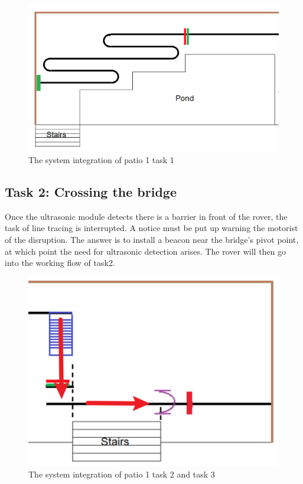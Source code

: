 \documentclass[12pt, a4paper, oneside]{report}
\begin{document}
 \begin{figure}[H]
     \centering
     \includegraphics[scale=0.5]{pic/patio1/5.png} 
     \caption{The system integration of patio 1 task 1 \cite{patio1}}
     \label{sysint2}
 \end{figure}

\subsection{Task 2: Crossing the bridge}
 Once the ultrasonic module detects there is a barrier in front of the rover, the task of line tracing is interrupted. A notice must be put up warning the motorist of the disruption. The answer is to install a beacon near the bridge's pivot point, at which point the need for ultrasonic detection arises. The rover will then go into the working flow of task2. 

 \begin{figure}[H]
     \centering
     \includegraphics[scale=0.55]{pic/patio1/6.png} 
     \caption{The system integration of patio 1 task 2 and task 3 \cite{patio1}}
     \label{sysint3}
 \end{figure}
\end{document}
